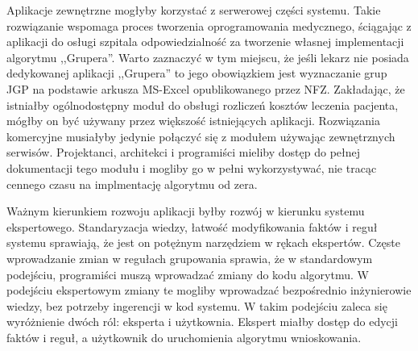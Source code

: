 Aplikacje zewnętrzne mogłyby korzystać z serwerowej części systemu. Takie rozwiązanie wspomaga proces tworzenia oprogramowania medycznego, ściągając z aplikacji do osługi szpitala odpowiedzialność za tworzenie własnej implementacji algorytmu ,,Grupera''. Warto zaznaczyć w tym miejscu, że jeśli lekarz nie posiada dedykowanej aplikacji ,,Grupera'' to jego obowiązkiem jest wyznaczanie grup JGP na podstawie arkusza MS-Excel opublikowanego przez NFZ\cite{plik_parametryzujacy}. 
Zakładając, że istniałby ogólnodostępny moduł do obsługi rozliczeń kosztów leczenia pacjenta, mógłby on być używany przez większość istniejących aplikacji. Rozwiązania komercyjne musiałyby jedynie połączyć się z modułem używając zewnętrznych serwisów. Projektanci, architekci i programiści mieliby dostęp do pełnej dokumentacji tego modułu i mogliby go w pełni wykorzystywać, nie tracąc cennego czasu na implmentację algorytmu od zera.

Ważnym kierunkiem rozwoju aplikacji byłby rozwój w kierunku systemu ekspertowego. Standaryzacja wiedzy, łatwość modyfikowania faktów i reguł systemu sprawiają, że jest on potężnym narzędziem w rękach ekspertów. Częste wprowadzanie zmian w regułach grupowania sprawia, że w standardowym podejściu, programiści muszą wprowadzać zmiany do kodu algorytmu. W podejściu ekspertowym zmiany te mogliby wprowadzać bezpośrednio inżynierowie wiedzy, bez potrzeby ingerencji w kod systemu.
W takim podejściu zaleca się wyróżnienie dwóch ról: eksperta i użytkownia. Ekspert miałby dostęp do edycji faktów i reguł, a użytkownik do uruchomienia algorytmu wnioskowania.

